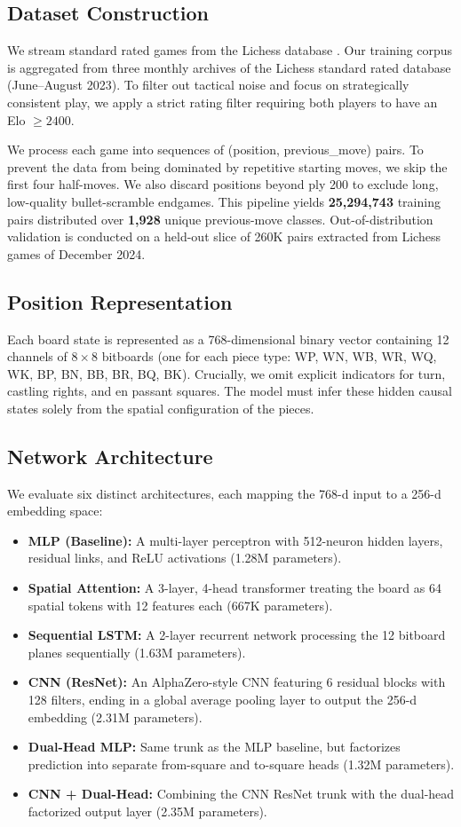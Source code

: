 \documentclass[journal]{IEEEtran}
\begin{document}
\subsection{Dataset Construction}
We stream standard rated games from the Lichess database \cite{ref-lichess}. Our training corpus is aggregated from three monthly archives of the Lichess standard rated database (June--August 2023). To filter out tactical noise and focus on strategically consistent play, we apply a strict rating filter requiring both players to have an Elo $\ge 2400$.

We process each game into sequences of (position, previous\_move) pairs. To prevent the data from being dominated by repetitive starting moves, we skip the first four half-moves. We also discard positions beyond ply 200 to exclude long, low-quality bullet-scramble endgames. This pipeline yields \textbf{25,294,743} training pairs distributed over \textbf{1,928} unique previous-move classes. Out-of-distribution validation is conducted on a held-out slice of 260K pairs extracted from Lichess games of December 2024.

\subsection{Position Representation}
Each board state is represented as a 768-dimensional binary vector containing 12 channels of $8 \times 8$ bitboards (one for each piece type: WP, WN, WB, WR, WQ, WK, BP, BN, BB, BR, BQ, BK). Crucially, we omit explicit indicators for turn, castling rights, and en passant squares. The model must infer these hidden causal states solely from the spatial configuration of the pieces.

\subsection{Network Architecture}
We evaluate six distinct architectures, each mapping the 768-d input to a 256-d embedding space:
\begin{itemize}
    \item \textbf{MLP (Baseline):} A multi-layer perceptron with 512-neuron hidden layers, residual links, and ReLU activations (1.28M parameters).
    \item \textbf{Spatial Attention:} A 3-layer, 4-head transformer treating the board as 64 spatial tokens with 12 features each (667K parameters).
    \item \textbf{Sequential LSTM:} A 2-layer recurrent network processing the 12 bitboard planes sequentially (1.63M parameters).
    \item \textbf{CNN (ResNet):} An AlphaZero-style CNN featuring 6 residual blocks with 128 filters, ending in a global average pooling layer to output the 256-d embedding (2.31M parameters).
    \item \textbf{Dual-Head MLP:} Same trunk as the MLP baseline, but factorizes prediction into separate from-square and to-square heads (1.32M parameters).
    \item \textbf{CNN + Dual-Head:} Combining the CNN ResNet trunk with the dual-head factorized output layer (2.35M parameters).
\end{itemize}
\end{document}
